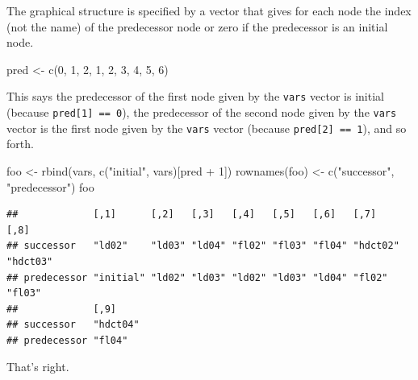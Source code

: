 \documentclass[
  ignorenonframetext,
]{beamer}
\newenvironment{Shaded}{\begin{snugshade}}{\end{snugshade}}
\newcommand{\DecValTok}[1]{\textcolor[rgb]{0.00,0.00,0.81}{#1}}
\newcommand{\FunctionTok}[1]{\textcolor[rgb]{0.00,0.00,0.00}{#1}}
\newcommand{\NormalTok}[1]{#1}
\newcommand{\OtherTok}[1]{\textcolor[rgb]{0.56,0.35,0.01}{#1}}
\newcommand{\SpecialCharTok}[1]{\textcolor[rgb]{0.00,0.00,0.00}{#1}}
\newcommand{\StringTok}[1]{\textcolor[rgb]{0.31,0.60,0.02}{#1}}
\begin{document}
\begin{frame}[fragile]{}
\protect\hypertarget{section-9}{}
The graphical structure is specified by a vector that gives for each
node the index (not the name) of the predecessor node or zero if the
predecessor is an initial node.

\vspace{12pt}

\begin{Shaded}
\begin{Highlighting}[]
\NormalTok{pred }\OtherTok{\textless{}{-}} \FunctionTok{c}\NormalTok{(}\DecValTok{0}\NormalTok{, }\DecValTok{1}\NormalTok{, }\DecValTok{2}\NormalTok{, }\DecValTok{1}\NormalTok{, }\DecValTok{2}\NormalTok{, }\DecValTok{3}\NormalTok{, }\DecValTok{4}\NormalTok{, }\DecValTok{5}\NormalTok{, }\DecValTok{6}\NormalTok{)}
\end{Highlighting}
\end{Shaded}

\vspace{12pt}

This says the predecessor of the first node given by the \texttt{vars}
vector is initial (because \texttt{pred[1] == 0}), the predecessor of
the second node given by the \texttt{vars} vector is the first node
given by the \texttt{vars} vector (because \texttt{pred[2] == 1}), and
so forth.
\end{frame}

\begin{frame}[fragile]{}
\protect\hypertarget{section-10}{}
\tiny

\begin{Shaded}
\begin{Highlighting}[]
\NormalTok{foo }\OtherTok{\textless{}{-}} \FunctionTok{rbind}\NormalTok{(vars, }\FunctionTok{c}\NormalTok{(}\StringTok{"initial"}\NormalTok{, vars)[pred }\SpecialCharTok{+} \DecValTok{1}\NormalTok{]) }
\FunctionTok{rownames}\NormalTok{(foo) }\OtherTok{\textless{}{-}} \FunctionTok{c}\NormalTok{(}\StringTok{"successor"}\NormalTok{, }\StringTok{"predecessor"}\NormalTok{)}
\NormalTok{foo}
\end{Highlighting}
\end{Shaded}

\begin{verbatim}
##             [,1]      [,2]   [,3]   [,4]   [,5]   [,6]   [,7]     [,8]    
## successor   "ld02"    "ld03" "ld04" "fl02" "fl03" "fl04" "hdct02" "hdct03"
## predecessor "initial" "ld02" "ld03" "ld02" "ld03" "ld04" "fl02"   "fl03"  
##             [,9]    
## successor   "hdct04"
## predecessor "fl04"
\end{verbatim}

\vspace{12pt}
\normalsize

That's right.
\end{frame}
\end{document}
